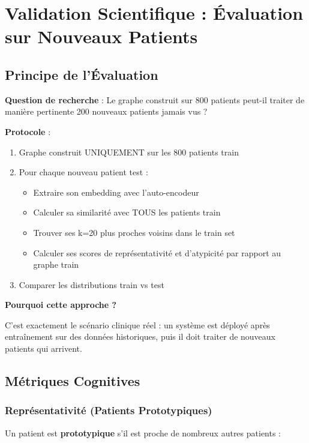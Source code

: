 \documentclass[12pt,a4paper]{article}
\begin{document}
\section{Validation Scientifique : Évaluation sur Nouveaux Patients}

\subsection{Principe de l'Évaluation}

\textbf{Question de recherche} : Le graphe construit sur 800 patients peut-il traiter de manière pertinente 200 nouveaux patients jamais vus ?

\textbf{Protocole} :
\begin{enumerate}
    \item Graphe construit UNIQUEMENT sur les 800 patients train
    \item Pour chaque nouveau patient test :
    \begin{itemize}
        \item Extraire son embedding avec l'auto-encodeur
        \item Calculer sa similarité avec TOUS les patients train
        \item Trouver ses k=20 plus proches voisins dans le train set
        \item Calculer ses scores de représentativité et d'atypicité par rapport au graphe train
    \end{itemize}
    \item Comparer les distributions train vs test
\end{enumerate}

\textbf{Pourquoi cette approche ?}

C'est exactement le scénario clinique réel : un système est déployé après entraînement sur des données historiques, puis il doit traiter de nouveaux patients qui arrivent.

\subsection{Métriques Cognitives}

\subsubsection{Représentativité (Patients Prototypiques)}

Un patient est \textbf{prototypique} s'il est proche de nombreux autres patients :
\end{document}
